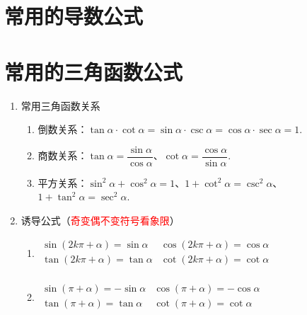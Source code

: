\documentclass[lang=cn,10pt]{elegantbook}
\begin{document}
\appendix
\chapter{常用的导数公式}

\chapter{常用的三角函数公式}
\begin{enumerate}
	\item 常用三角函数关系
	\begin{enumerate}
		\item 倒数关系：\( \tan \alpha \cdot \cot \alpha = \sin \alpha \cdot \csc \alpha = \cos \alpha \cdot \sec \alpha = 1 \).
		\\
		\item 商数关系：\( \tan \alpha = \dfrac{\sin \alpha}{\cos \alpha} \)、\( \cot \alpha = \dfrac{\cos\alpha}{\sin\alpha} \).
		\\
		\item 平方关系：\( \sin^{2}\alpha + \cos^{2}\alpha = 1 \)、\( 1 + \cot^{2}\alpha = \csc^{2}\alpha \)、\( 1 + \tan^{2}\alpha = \sec^{2}\alpha \).
	\end{enumerate}
	\item 诱导公式（\textcolor{red}{奇变偶不变符号看象限}）
	\begin{enumerate}
		\item 
		\( \begin{array}{ll}
			\sin(2k\pi + \alpha) = \sin \alpha & \cos(2k\pi + \alpha) = \cos \alpha \\
			\tan(2k\pi + \alpha) = \tan \alpha & \cot(2k\pi + \alpha) = \cot \alpha \\
		\end{array}
		\)
		\item 
		\(
			\begin{array}{ll}
				\sin(\pi + \alpha) = -\sin \alpha & \cos(\pi + \alpha) = -\cos \alpha \\
				\tan(\pi + \alpha) = \tan \alpha &	\cot(\pi + \alpha) = \cot \alpha \\		
			\end{array}
		\)
	\end{enumerate}
\end{enumerate}
\end{document}
